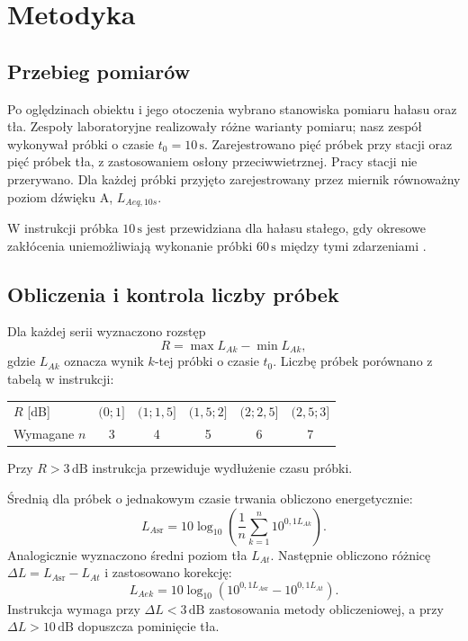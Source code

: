 \section{Metodyka}
\label{sec:metodyka}
\subsection{Przebieg pomiarów}
Po oględzinach obiektu i jego otoczenia wybrano stanowiska
pomiaru hałasu oraz tła. Zespoły laboratoryjne realizowały różne
warianty pomiaru; nasz zespół wykonywał próbki o czasie
$t_0=10\,\mathrm{s}$. Zarejestrowano pięć próbek przy stacji
oraz pięć próbek tła, z zastosowaniem osłony przeciwwietrznej.
Pracy stacji nie przerywano.
Dla każdej próbki przyjęto zarejestrowany przez miernik
równoważny poziom dźwięku A, $L_{Aeq,10s}$.

W instrukcji próbka $10\,\mathrm{s}$ jest przewidziana dla hałasu
stałego, gdy okresowe zakłócenia uniemożliwiają wykonanie próbki
$60\,\mathrm{s}$ między tymi zdarzeniami
\autocite{piechowicz-konspekt}.


\subsection{Obliczenia i kontrola liczby próbek}
Dla każdej serii wyznaczono rozstęp
\begin{equation}
 R=\max L_{Ak}-\min L_{Ak},
\end{equation}
gdzie $L_{Ak}$ oznacza wynik $k$-tej próbki o czasie $t_0$.
Liczbę próbek porównano z tabelą w instrukcji:
\begin{center}
\begin{tabular}{@{}lccccc@{}}
\toprule
$R$ [dB] & $(0;1]$ & $(1;1{,}5]$ & $(1{,}5;2]$ & $(2;2{,}5]$ & $(2{,}5;3]$ \\
Wymagane $n$ & 3 & 4 & 5 & 6 & 7 \\
\bottomrule
\end{tabular}
\end{center}
Przy $R>3\,\mathrm{dB}$ instrukcja przewiduje wydłużenie czasu
próbki.

Średnią dla próbek o jednakowym czasie trwania obliczono
energetycznie:
\begin{equation}
 L_{A\mathrm{sr}}=10\log_{10}\left(
 \frac{1}{n}\sum_{k=1}^{n}10^{0{,}1L_{Ak}}\right).
 \label{eq:srednia-energetyczna}
\end{equation}
Analogicznie wyznaczono średni poziom tła $L_{At}$.
Następnie obliczono różnicę $\Delta L=L_{A\mathrm{sr}}-L_{At}$
i zastosowano korekcję:
\begin{equation}
 L_{Aek}=10\log_{10}\left(
 10^{0{,}1L_{A\mathrm{sr}}}-10^{0{,}1L_{At}}\right).
 \label{eq:korekcja-tla}
\end{equation}
Instrukcja wymaga przy $\Delta L<3\,\mathrm{dB}$ zastosowania
metody obliczeniowej, a przy $\Delta L>10\,\mathrm{dB}$ dopuszcza
pominięcie tła.

